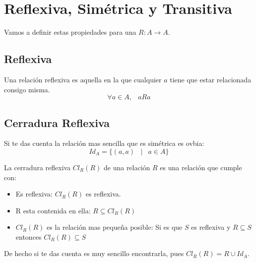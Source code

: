 \documentclass[12pt, fleqn]{report}                             %
\DeclareMathOperator \Space {\quad}                             %
\DeclareMathOperator \MiniSpace {\;}                            %
\newcommand \Such {\MiniSpace|\MiniSpace}                       %
\begin{document}
        \section{Reflexiva, Simétrica y Transitiva}

            Vamos a definir estas propiedades para una $R: A \to A$.
                
            \subsection{Reflexiva}

                Una relación reflexiva es aquella en la que cualquier $a$ tiene que estar relacionada
                consigo misma.
                \begin{equation*}
                    \forall a \in A, \MiniSpace aRa
                \end{equation*}


            \subsection*{Cerradura Reflexiva}

                Si te das cuenta la relación mas sencilla que es simétrica es ovbia:
                \begin{equation*}
                    Id_A = \{ (a, a) \Such a \in A \}
                \end{equation*}


                La cerradura reflexiva $Cl_R(R)$ de una relación $R$ es una relación que cumple con:

                \begin{itemize}
                    \item Es reflexiva: $Cl_R(R)$ es reflexiva. 
                    \item R esta contenida en ella: $R \subseteq Cl_R(R)$
                    \item $Cl_R(R)$ es la relación mas pequeña posible: 
                    Si es que $S$ es reflexiva y $R \subseteq S$ entonces $Cl_R(R) \subseteq S$
                \end{itemize}



                De hecho si te das cuenta es muy sencillo encontrarla, pues
                $Cl_R(R) = R \cup Id_A$.
\end{document}
